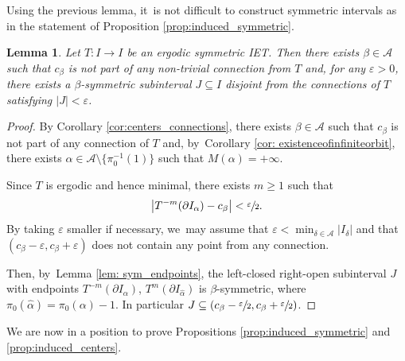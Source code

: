 \documentclass[JEP,XML,SOM,Unicode,NoEqCountersInSection,NoFloatCountersInSection,published]{cedram}
\let\epsilon\varepsilon
\theoremstyle{plain}
\newtheorem{lemma}[theorem]{Lemma}
\theoremstyle{definition}
\newcommand{\A}{\mathcal{A}}
\begin{document}
Using the previous lemma, it~is not difficult to construct symmetric intervals as in the statement of Proposition \ref{prop:induced_symmetric}.

\begin{lemma}
\label{lem:sym_int_disjoint}
Let $T: I \to I$ be an ergodic symmetric IET. Then there exists $\beta \in \A$ such that $c_\beta$ is not part of any non-trivial connection from $T$ and, for any $\epsilon > 0$, there exists a $\beta$-symmetric subinterval $J\subseteq I$ disjoint from the connections of $T$ satisfying $|J| < \epsilon$.
\end{lemma}

\begin{proof}
By Corollary \ref{cor:centers_connections}, there exists $\beta \in \A$ such that $c_\beta$ is not part of any connection of $T$ and, by~Corollary \ref{cor: existenceofinfiniteorbit}, there exists $\alpha \in \A \setminus \{\pi_0^{-1}(1)\}$ such that $M(\alpha) = +\infty$.

Since $T$ is ergodic and hence minimal, there exists $m \geq 1$ such that
\[
\big|T^{-m}(\partial I_\alpha) - c_\beta \big| < \sfrac{\epsilon}{2}.
\]
By taking $\epsilon$ smaller if necessary, we~may assume that $\epsilon < \min_{\delta \in \A} |I_\delta|$ and that $(c_\beta - \epsilon, c_\beta + \epsilon)$ does not contain any point from any connection.

Then, by~Lemma \ref{lem: sym_endpoints}, the left-closed right-open subinterval $J$ with endpoints $T^{-m}(\partial I_\alpha)$, $T^{m}(\partial I_{\hat \alpha})$ is $\beta$-symmetric, where $\pi_0(\hat \alpha) = \pi_0(\alpha) - 1$. In particular $J \subseteq (c_\beta - \sfrac{\epsilon}{2}, c_\beta + \sfrac{\epsilon}{2})$.
\end{proof}

We are now in a position to prove Propositions \ref{prop:induced_symmetric} and \ref{prop:induced_centers}.
\end{document}
